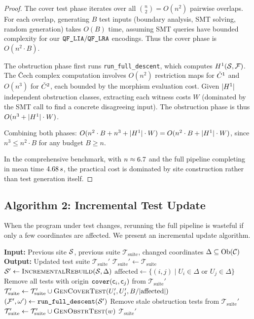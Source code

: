 \documentclass[11pt]{article}
\newcommand{\RunDescent}{\texttt{run\_full\_descent}}
\newcommand{\TestSuite}{\mathcal{T}_{\mathrm{suite}}}
\begin{document}
\begin{proof}
The cover test phase iterates over all $\binom{n}{2} = O(n^2)$ pairwise
overlaps.  For each overlap, generating $B$ test inputs (boundary analysis,
SMT solving, random generation) takes $O(B)$ time, assuming SMT queries
have bounded complexity for our $\texttt{QF\_LIA}/\texttt{QF\_LRA}$ encodings.  Thus the
cover phase is $O(n^2 \cdot B)$.

The obstruction phase first runs \RunDescent, which computes
$H^{1}(\mathcal{S}, \mathcal{F})$.  The \v{C}ech complex computation involves
$O(n^2)$ restriction maps for $\check{C}^1$ and $O(n^3)$ for $\check{C}^2$,
each bounded by the morphism evaluation cost.  Given $|H^{1}|$
independent obstruction classes, extracting each witness costs $W$
(dominated by the SMT call to find a concrete disagreeing input).
The obstruction phase is thus $O(n^3 + |H^{1}| \cdot W)$.

Combining both phases:
$O(n^2 \cdot B + n^3 + |H^{1}| \cdot W) = O(n^2 \cdot B + |H^{1}| \cdot W)$,
since $n^3 \leq n^2 \cdot B$ for any budget $B \geq n$.

In the comprehensive benchmark, with $n \approx 6.7$ and the
full pipeline completing in mean time $4.68\,s$, the practical
cost is dominated by site construction rather than test generation itself.
\end{proof}

\subsection{Algorithm 2: Incremental Test Update}\label{sec:incremental}

When the program under test changes, rerunning the full pipeline is
wasteful if only a few coordinates are affected.  We present an
incremental update algorithm.

\begin{algorithm}[H]
\caption{Incremental Test Suite Update}
\label{alg:incremental}
\begin{algorithmic}[1]
\STATE \textbf{Input:} Previous site $\mathcal{S}$, previous suite
       $\TestSuite$, changed coordinates $\Delta \subseteq \mathrm{Ob}(\mathcal{C})$
\STATE \textbf{Output:} Updated test suite $\TestSuite'$
\STATE $\TestSuite' \gets \TestSuite$
\STATE $\mathcal{S}' \gets \textsc{IncrementalRebuild}(\mathcal{S}, \Delta)$
\STATE $\mathrm{affected} \gets \{(i,j) \mid U_i \in \Delta \text{ or }
       U_j \in \Delta\}$
  \STATE Remove all tests with origin $\texttt{cover}(\mathsf{c}_i, \mathsf{c}_j)$
         from $\TestSuite'$
  \STATE $\TestSuite' \gets \TestSuite' \cup
         \textsc{GenCoverTest}(U_i', U_j', B / |\mathrm{affected}|)$
\ENDFOR
\STATE $(\mathcal{F}', \omega') \gets \RunDescent(\Site')$
  \STATE Remove stale obstruction tests from $\TestSuite'$
    \STATE $\TestSuite' \gets \TestSuite' \cup \textsc{GenObstrTest}(w)$
  \ENDFOR
\ENDIF
\RETURN $\TestSuite'$
\end{algorithmic}
\end{algorithm}
\end{document}
